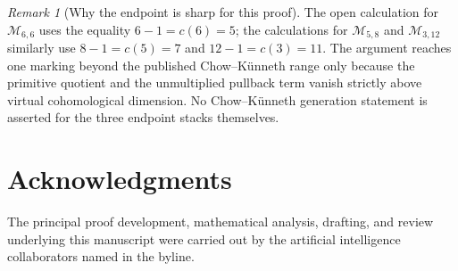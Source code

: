 \documentclass[12pt,reqno]{amsart}
\newcommand{\M}{\mathcal{M}}
\theoremstyle{definition}
\theoremstyle{remark}
\newtheorem{remark}[theorem]{Remark}
\begin{document}
\begin{remark}[Why the endpoint is sharp for this proof]
The open calculation for $\M_{6,6}$ uses the equality $6-1=c(6)=5$; the
calculations for $\M_{5,8}$ and $\M_{3,12}$ similarly use
$8-1=c(5)=7$ and $12-1=c(3)=11$.  The argument reaches one marking beyond
the published Chow--K\"unneth range only because the primitive quotient and
the unmultiplied pullback term vanish strictly above virtual cohomological
dimension.  No Chow--K\"unneth generation statement is asserted for the
three endpoint stacks themselves.
\end{remark}

\section*{Acknowledgments}

The principal proof development, mathematical analysis, drafting, and review
underlying this manuscript were carried out by the artificial intelligence
collaborators named in the byline.
\end{document}
